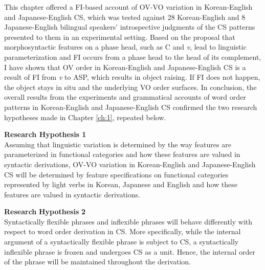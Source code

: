 This chapter offered a \ac{FI}-based account of \ac{OV}-\ac{VO} variation in Korean-English and Japanese-English \ac{CS}, which was tested against 28 Korean-English and 8 Japanese-English bilingual speakers’ introspective judgments of the \ac{CS} patterns presented to them in an experimental setting. Based on the proposal that morphosyntactic features on a phase head, such as C and \textit{v}, lead to linguistic parameterization and \ac{FI} occurs from a phase head to the head of its complement, I have shown that \ac{OV} order in Korean-English and Japanese-English \ac{CS} is a result of \ac{FI} from \textit{v} to \ac{ASP}, which results in object raising. If \ac{FI} does not happen, the object stays in situ and the underlying \ac{VO} order surfaces. In conclusion, the overall results from the experiments and grammatical accounts of word order patterns in Korean-English and Japanese-English \ac{CS} confirmed the two research hypotheses made in Chapter \ref{ch:1}, repeated below. 

\begin{exe}
\sn \textbf{Research Hypothesis 1} \\
 Assuming that linguistic variation is determined by the way features are parameterized in functional categories and how these features are valued in syntactic derivations, \ac{OV}-\ac{VO} variation in Korean-English and Japanese-English \ac{CS} will be determined by feature specifications on functional categories represented by light verbs in Korean, Japanese and English and how these features are valued in syntactic derivations.
\end{exe}

\begin{exe} 
\sn \textbf{Research} \textbf{Hypothesis} \textbf{2} \\
 Syntactically flexible phrases and inflexible phrases will behave differently with respect to word order derivation in \ac{CS}. More specifically, while the internal argument of a syntactically flexible phrase is subject to \ac{CS}, a syntactically inflexible phrase is frozen and undergoes \ac{CS} as a unit. Hence, the internal order of the phrase will be maintained throughout the derivation.
\end{exe}
